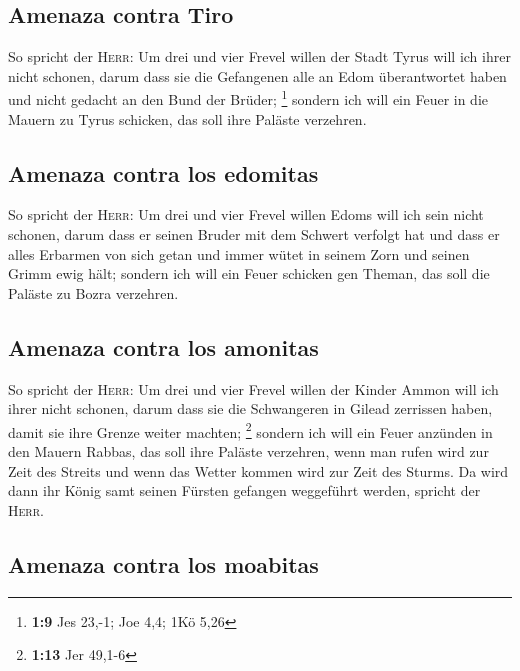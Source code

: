 \hypertarget{amenaza-contra-tiro}{%
\subsection{Amenaza contra Tiro}\label{amenaza-contra-tiro}}

 So spricht der \textsc{Herr}: Um drei und vier Frevel
willen der Stadt Tyrus will ich ihrer nicht schonen, darum dass sie die
Gefangenen alle an Edom überantwortet haben und nicht gedacht an den
Bund der Brüder; \footnote{\textbf{1:9} Jes 23,-1; Joe 4,4; 1Kö 5,26}
 sondern ich will ein Feuer in die Mauern zu Tyrus
schicken, das soll ihre Paläste verzehren.

\hypertarget{amenaza-contra-los-edomitas}{%
\subsection{Amenaza contra los
edomitas}\label{amenaza-contra-los-edomitas}}

 So spricht der \textsc{Herr}: Um drei und vier Frevel
willen Edoms will ich sein nicht schonen, darum dass er seinen Bruder
mit dem Schwert verfolgt hat und dass er alles Erbarmen von sich getan
und immer wütet in seinem Zorn und seinen Grimm ewig hält;
 sondern ich will ein Feuer schicken gen Theman, das soll
die Paläste zu Bozra verzehren.

\hypertarget{amenaza-contra-los-amonitas}{%
\subsection{Amenaza contra los
amonitas}\label{amenaza-contra-los-amonitas}}

 So spricht der \textsc{Herr}: Um drei und vier Frevel
willen der Kinder Ammon will ich ihrer nicht schonen, darum dass sie die
Schwangeren in Gilead zerrissen haben, damit sie ihre Grenze weiter
machten; \footnote{\textbf{1:13} Jer 49,1-6}  sondern ich
will ein Feuer anzünden in den Mauern Rabbas, das soll ihre Paläste
verzehren, wenn man rufen wird zur Zeit des Streits und wenn das Wetter
kommen wird zur Zeit des Sturms.  Da wird dann ihr König
samt seinen Fürsten gefangen weggeführt werden, spricht der
\textsc{Herr}.

\hypertarget{amenaza-contra-los-moabitas}{%
\subsection{Amenaza contra los
moabitas}\label{amenaza-contra-los-moabitas}}

